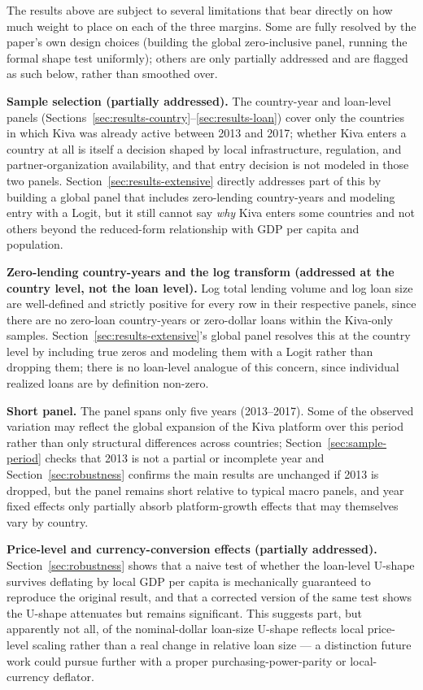\documentclass[12pt]{article}
\begin{document}
The results above are subject to several limitations that bear directly on how much weight to place on
each of the three margins. Some are fully resolved by the paper's own design choices (building the
global zero-inclusive panel, running the formal shape test uniformly); others are only partially
addressed and are flagged as such below, rather than smoothed over.

\textbf{Sample selection (partially addressed).} The country-year and loan-level panels
(Sections~\ref{sec:results-country}--\ref{sec:results-loan}) cover only the countries in which Kiva
was already active between 2013 and 2017; whether Kiva enters a country at all is itself a decision
shaped by local infrastructure, regulation, and partner-organization availability, and that entry
decision is not modeled in those two panels. Section~\ref{sec:results-extensive} directly addresses
part of this by building a global panel that includes zero-lending country-years and modeling entry
with a Logit, but it still cannot say \emph{why} Kiva enters some countries and not others beyond the
reduced-form relationship with GDP per capita and population.

\textbf{Zero-lending country-years and the log transform (addressed at the country level, not the
loan level).} Log total lending volume and log loan size are well-defined and strictly positive for
every row in their respective panels, since there are no zero-loan country-years or zero-dollar loans
within the Kiva-only samples. Section~\ref{sec:results-extensive}'s global panel resolves this at the
country level by including true zeros and modeling them with a Logit rather than dropping them; there
is no loan-level analogue of this concern, since individual realized loans are by definition non-zero.

\textbf{Short panel.} The panel spans only five years (2013--2017). Some of the observed variation may
reflect the global expansion of the Kiva platform over this period rather than only structural
differences across countries; Section~\ref{sec:sample-period} checks that 2013 is not a partial or
incomplete year and Section~\ref{sec:robustness} confirms the main results are unchanged if 2013 is
dropped, but the panel remains short relative to typical macro panels, and year fixed effects only
partially absorb platform-growth effects that may themselves vary by country.

\textbf{Price-level and currency-conversion effects (partially addressed).}
Section~\ref{sec:robustness} shows that a naive test of whether the loan-level U-shape survives
deflating by local GDP per capita is mechanically guaranteed to reproduce the original result, and that
a corrected version of the same test shows the U-shape attenuates but remains significant. This
suggests part, but apparently not all, of the nominal-dollar loan-size U-shape reflects local
price-level scaling rather than a real change in relative loan size --- a distinction future work could
pursue further with a proper purchasing-power-parity or local-currency deflator.
\end{document}
